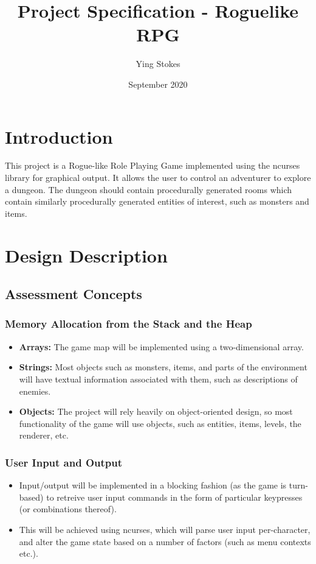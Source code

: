 \documentclass{article}
\title{Project Specification - Roguelike RPG}
\author{Ying Stokes}
\date{September 2020}
\begin{document}
\maketitle

\section{Introduction}
This project is a Rogue-like Role Playing Game implemented using the ncurses library for graphical output. It allows the user to control an adventurer to explore a dungeon. The dungeon should contain procedurally generated rooms which contain similarly procedurally generated entities of interest, such as monsters and items.

\section{Design Description}
\subsection{Assessment Concepts}
\subsubsection{Memory Allocation from the Stack and the Heap}
\begin{itemize}
    \item \textbf{Arrays:} The game map will be implemented using a two-dimensional array.
    \item \textbf{Strings:} Most objects such as monsters, items, and parts of the environment will have textual information associated with them, such as descriptions of enemies.
    \item \textbf{Objects:} The project will rely heavily on object-oriented design, so most functionality of the game will use objects, such as entities, items, levels, the renderer, etc.
\end{itemize}

\subsubsection{User Input and Output}
\begin{itemize}
    \item Input/output will be implemented in a blocking fashion (as the game is turn-based) to retreive user input commands in the form of particular keypresses (or combinations thereof).
    \item This will be achieved using ncurses, which will parse user input per-character, and alter the game state based on a number of factors (such as menu contexts etc.).
\end{itemize}
\end{document}
